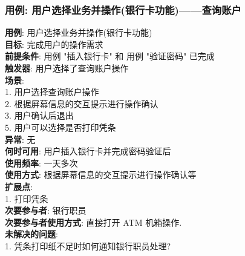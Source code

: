 \documentclass[UTF8]{article}
\begin{document}
\subsubsection{用例: 用户选择业务并操作(银行卡功能)——查询账户}
\noindent
\textbf{用例}: 用户选择业务并操作(银行卡功能)
\\
\textbf{目标}: 完成用户的操作需求
\\
\textbf{前提条件}: 用例 "插入银行卡" 和 用例 "验证密码" 已完成
\\
\textbf{触发器}: 用户选择了查询账户操作
\\
\textbf{场景}: \\
	\hspace*{2em}1. 用户选择查询账户操作 \\
	\hspace*{2em}2. 根据屏幕信息的交互提示进行操作确认 \\
	\hspace*{2em}3. 用户确认后退出 \\
	\hspace*{2em} 5. 用户可以选择是否打印凭条 \\
\textbf{异常}: 无 \\
\textbf{何时可用}: 用户插入银行卡并完成密码验证后
\\
\textbf{使用频率}: 一天多次
\\
\textbf{使用方式}: 根据屏幕信息的交互提示进行操作确认等
\\
\textbf{扩展点}: \\
	\hspace*{2em}1. 打印凭条 \\
\textbf{次要参与者}: 银行职员
\\
\textbf{次要参与者使用方式}: 直接打开 ATM 机箱操作.
\\
\textbf{未解决的问题}: \\
	\hspace*{2em} 1. 凭条打印纸不足时如何通知银行职员处理? \\
			
\end{document}
